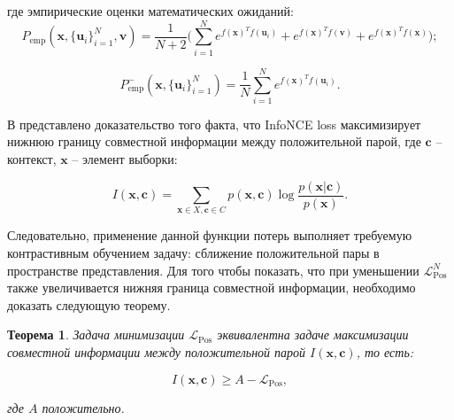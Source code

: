 \documentclass[a4paper, 14pt]{article}
\newtheorem{theorem}{Теорема}
\begin{document}
\noindent где эмпирические оценки математических ожиданий:
\begin{equation} \label{eq:12}
P_{\text{emp}} (\textbf{x}, \{\textbf{u}_i\}_{i=1}^N, \textbf{v}) = \frac{1}{N+2} \bigg(\sum \limits_{i=1}^N e^{f(\textbf{x})^T f(\textbf{u}_i)} + e^{f(\textbf{x})^T f(\textbf{v})} + e^{f(\textbf{x})^T f(\textbf{x})}\bigg);
\end{equation}

\begin{equation} \label{eq:13}
P_{\text{emp}}^- (\textbf{x}, \{\textbf{u}_i\}_{i=1}^N) = \frac{1}{N} \sum \limits_{i=1}^N e^{f(\textbf{x})^T f(\textbf{u}_i)}.
\end{equation}

В \citep{Oord2018RepresentationLW} представлено доказательство того факта, что InfoNCE loss максимизирует нижнюю границу совместной информации между положительной парой, где $\mathbf{c}$ -- контекст, $\mathbf{x}$ -- элемент выборки:

\[I(\mathbf{x}, \mathbf{c}) = \sum\limits_{\mathbf{x} \in X, \mathbf{c} \in C}p(\mathbf{x}, \mathbf{c})\log \frac{p(\mathbf{x}|\mathbf{c})}{p(\mathbf{x})}.\]

Следовательно, применение данной функции потерь выполняет требуемую контрастивным обучением задачу: сближение положительной пары в пространстве представления. Для того чтобы показать, что при уменьшении $\mathcal{L}_{\text{Pos}}^N$ также увеличивается нижняя граница совместной информации, необходимо доказать следующую теорему.

\begin{theorem}
\label{thm:info}
Задача минимизации $\mathcal{L}_{\text{Pos}}$ эквивалентна задаче максимизации совместной информации между положительной парой $I(\mathbf{x}, \mathbf{c})$, то есть:

\[I(\mathbf{x}, \mathbf{c}) \geq A - \mathcal{L}_{\text{Pos}},\]

\noindent где $A$ положительно.
\end{theorem}
\end{document}
